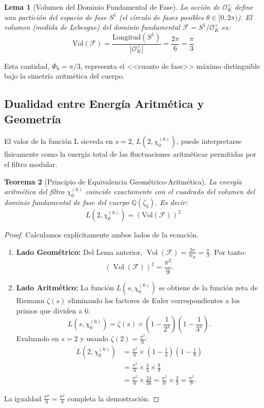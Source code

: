 \documentclass[12pt, a4paper]{article}
\theoremstyle{plain}
\newtheorem{teorema}{Teorema}[section]
\newtheorem{lema}[teorema]{Lema}
\theoremstyle{definition}
\theoremstyle{remark}
\begin{document}
\begin{lema}[Volumen del Dominio Fundamental de Fase]
La acción de $\mathcal{O}_K^\times$ define una partición del espacio de fase $S^1$ (el círculo de fases posibles $\theta \in [0, 2\pi)$). El volumen (medida de Lebesgue) del dominio fundamental $\mathcal{F} = S^1 / \mathcal{O}_K^\times$ es:
\[
\text{Vol}(\mathcal{F}) = \frac{\text{Longitud}(S^1)}{|\mathcal{O}_K^\times|} = \frac{2\pi}{6} = \frac{\pi}{3}
\]
\end{lema}

Esta cantidad, $\Phi_0 = \pi/3$, representa el <<cuanto de fase>> máximo distinguible bajo la simetría aritmética del cuerpo.

\subsection{Dualidad entre Energía Aritmética y Geometría}

El valor de la función L sieveda en $s=2$, $L(2, \chi_0^{(6)})$, puede interpretarse físicamente como la energía total de las fluctuaciones aritméticas permitidas por el filtro modular.

\begin{teorema}[Principio de Equivalencia Geométrico-Aritmética]
La energía aritmética del filtro $\chi_0^{(6)}$ coincide exactamente con el cuadrado del volumen del dominio fundamental de fase del cuerpo $\mathbb{Q}(\zeta_3)$. Es decir:
\[
L(2, \chi_0^{(6)}) = \left( \text{Vol}(\mathcal{F}) \right)^2
\]
\end{teorema}

\begin{proof}
Calculamos explícitamente ambos lados de la ecuación.
\begin{enumerate}
    \item \textbf{Lado Geométrico:}
    Del Lema anterior, $\operatorname{Vol}(\mathcal{F}) = \frac{2\pi}{w_K} = \frac{\pi}{3}$. Por tanto:
    \[
    \left( \operatorname{Vol}(\mathcal{F}) \right)^2 = \frac{\pi^2}{9}.
    \]

    \item \textbf{Lado Aritmético:}
    La función $L(s, \chi_0^{(6)})$ se obtiene de la función zeta de Riemann $\zeta(s)$ eliminando los factores de Euler correspondientes a los primos que dividen a 6:
    \[
    L(s, \chi_0^{(6)}) = \zeta(s) \times \left(1 - \frac{1}{2^s}\right) \left(1 - \frac{1}{3^s}\right).
    \]
    Evaluando en $s=2$ y usando $\zeta(2) = \frac{\pi^2}{6}$:
    \[
    \begin{aligned}
    L(2, \chi_0^{(6)}) &= \frac{\pi^2}{6} \times \left(1 - \frac{1}{4}\right) \left(1 - \frac{1}{9}\right) \\
    &= \frac{\pi^2}{6} \times \frac{3}{4} \times \frac{8}{9} \\
    &= \frac{\pi^2}{6} \times \frac{24}{36} = \frac{\pi^2}{6} \times \frac{2}{3} = \frac{\pi^2}{9}.
    \end{aligned}
    \]
\end{enumerate}
La igualdad $\frac{\pi^2}{9} = \frac{\pi^2}{9}$ completa la demostración. \qedhere
\end{proof}
\end{document}
